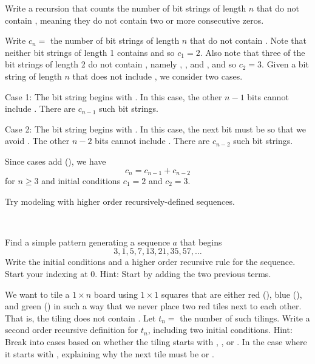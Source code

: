 \begin{exam}
\label{exam_count_bit_strings_using_recursion_second}
    Write a recursion that counts the number of bit strings of length $n$ that do not contain , meaning they do not contain two or more consecutive zeros.
        \begin{soln}
            Write $c_n=$ the number of bit strings of length $n$ that do not contain . Note that neither bit strings of length 1 contains  and so $c_1=2$.  Also note that three of the bit strings of length 2 do not contain , namely , , and , and so $c_2=3$.  Given a bit string of length $n$ that does not include , we consider two cases.

            Case 1: The bit string begins with .  In this case, the other $n-1$ bits cannot include .  There are $c_{n-1}$ such bit strings.

            Case 2:  The bit string begins with .  In this case, the next bit must be  so that we avoid .  The other $n-2$ bits cannot include .   There are $c_{n-2}$ such bit strings.

            Since cases add (), we have
                $$c_n=c_{n-1}+c_{n-2}$$
            for $n\ge 3$ and initial conditions $c_1=2$ and $c_2=3$.  
        \end{soln}
\end{exam}

Try modeling with higher order recursively-defined sequences.

\begin{act}
\label{act_model_higher_order_rec}  
~
    \begin{actpart}
        \item Find a simple pattern generating a sequence $a$ that begins 
            $$3, 1, 5, 7, 13, 21, 35, 57, \ldots$$
        Write the initial conditions and a higher order recursive rule for the sequence. Start your indexing at 0. Hint: Start by adding the two previous terms.%
        \item We want to tile a $1 \times n$ board using $1 \times 1$ squares that are either red (), blue (), and green () in such a way that we never place two  red tiles next to each other.  That is, the tiling does not contain .  Let $t_n=$ the number of such tilings.  Write a second order recursive definition for $t_n$, including two initial conditions. Hint: Break into cases based on whether the tiling starts with , , or . In the case where it starts with , explaining why the next tile must be  or .
    \end{actpart}
\end{act}

